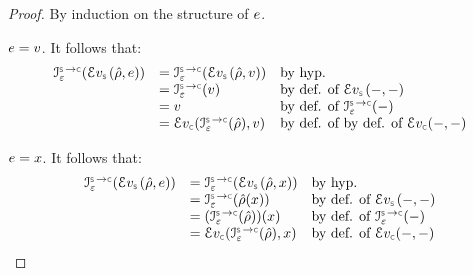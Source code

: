 \begin{proof}
By induction on the structure of  $e$. 
\vspace{5pt}

\noindent {} $e = v$. It follows that: 
$$
\begin{array}{lll}
  \interpret{\symbconc}{\senv}(\evalexpr{\symbolic}(\sstore, \jsilexpr))  &
       =  \interpret{\symbconc}{\senv}(\evalexpr{\symbolic}(\sstore, \val)) & \text{by hyp.} \\  & 
       =  \interpret{\symbconc}{\senv}(\val)  & \text{by def. of } \evalexpr{\symbolic}(-, -) \\ & 
       = \val  & \text{by def. of } \interpret{\symbconc}{\senv}(-) \\ &
       = \evalexpr{\concrete}(\interpret{\symbconc}{\senv}(\sstore), \val)  & \text{by def. of }  \text{by def. of } \evalexpr{\concrete}(-, -)
\end{array}
$$
\vspace{3pt}

\noindent {} $e = x$. It follows that: 
$$
\begin{array}{lll}
  \interpret{\symbconc}{\senv}(\evalexpr{\symbolic}(\sstore, \jsilexpr))  &
       =  \interpret{\symbconc}{\senv}(\evalexpr{\symbolic}(\sstore, \jvar)) & \text{by hyp.} \\  & 
       =  \interpret{\symbconc}{\senv}(\sstore(\jvar))  & \text{by def. of } \evalexpr{\symbolic}(-, -) \\ & 
       =  (\interpret{\symbconc}{\senv}(\sstore))(\jvar)   & \text{by def. of } \interpret{\symbconc}{\senv}(-) \\ &
       = \evalexpr{\concrete}(\interpret{\symbconc}{\senv}(\sstore), \jvar)  &  \text{by def. of } \evalexpr{\concrete}(-, -)
\end{array}
$$
\vspace{3pt}


\end{proof}
